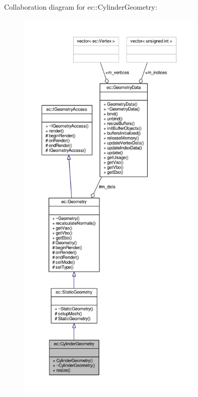 Collaboration diagram for ec\+:\+:Cylinder\+Geometry\+:\nopagebreak
\begin{figure}[H]
\begin{center}
\leavevmode
\includegraphics[height=550pt]{classec_1_1_cylinder_geometry__coll__graph}
\end{center}
\end{figure}
